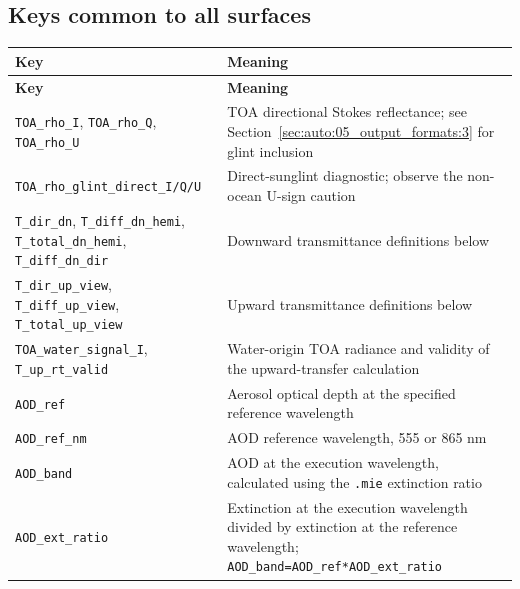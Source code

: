 \subsection{Keys common to all surfaces}
\label{sec:auto:05_output_formats:4.1}

{\TableFont
\begin{longtable}{@{}>{\raggedright\arraybackslash}p{}>{\raggedright\arraybackslash}p{}@{}}
\toprule
\textbf{Key} & \textbf{Meaning} \\
\midrule
\endfirsthead
\toprule
\textbf{Key} & \textbf{Meaning} \\
\midrule
\endhead
\bottomrule
\endfoot
\texttt{TOA\_\allowbreak{}rho\_\allowbreak{}I}, \texttt{TOA\_\allowbreak{}rho\_\allowbreak{}Q}, \texttt{TOA\_\allowbreak{}rho\_\allowbreak{}U} & TOA directional Stokes reflectance; see Section~\ref{sec:auto:05_output_formats:3} for glint inclusion \\
\texttt{TOA\_\allowbreak{}rho\_\allowbreak{}glint\_\allowbreak{}direct\_\allowbreak{}I/\allowbreak{}Q/\allowbreak{}U} & Direct-sunglint diagnostic; observe the non-ocean U-sign caution \\
\texttt{T\_\allowbreak{}dir\_\allowbreak{}dn}, \texttt{T\_\allowbreak{}diff\_\allowbreak{}dn\_\allowbreak{}hemi}, \texttt{T\_\allowbreak{}total\_\allowbreak{}dn\_\allowbreak{}hemi}, \texttt{T\_\allowbreak{}diff\_\allowbreak{}dn\_\allowbreak{}dir} & Downward transmittance definitions below \\
\texttt{T\_\allowbreak{}dir\_\allowbreak{}up\_\allowbreak{}view}, \texttt{T\_\allowbreak{}diff\_\allowbreak{}up\_\allowbreak{}view}, \texttt{T\_\allowbreak{}total\_\allowbreak{}up\_\allowbreak{}view} & Upward transmittance definitions below \\
\texttt{TOA\_\allowbreak{}water\_\allowbreak{}signal\_\allowbreak{}I}, \texttt{T\_\allowbreak{}up\_\allowbreak{}rt\_\allowbreak{}valid} & Water-origin TOA radiance and validity of the upward-transfer calculation \\
\texttt{AOD\_\allowbreak{}ref} & Aerosol optical depth at the specified reference wavelength \\
\texttt{AOD\_\allowbreak{}ref\_\allowbreak{}nm} & AOD reference wavelength, 555 or 865 nm \\
\texttt{AOD\_\allowbreak{}band} & AOD at the execution wavelength, calculated using the \texttt{.\allowbreak{}mie} extinction ratio \\
\texttt{AOD\_\allowbreak{}ext\_\allowbreak{}ratio} & Extinction at the execution wavelength divided by extinction at the reference wavelength; \texttt{AOD\_\allowbreak{}band=\allowbreak{}AOD\_\allowbreak{}ref*AOD\_\allowbreak{}ext\_\allowbreak{}ratio} \\

\end{longtable}}
